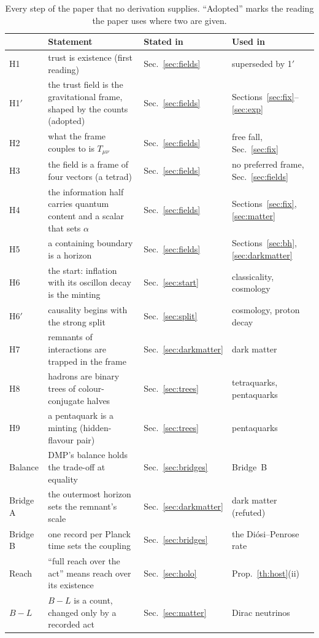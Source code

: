 \begin{table}[tb]\centering\small
\caption{Every step of the paper that no derivation supplies. ``Adopted'' marks the reading the paper uses where two are given.}
\label{tab:hyp}
\begin{tabularx}{\linewidth}{@{}lLlL@{}}
\toprule
& Statement & Stated in & Used in \\
\midrule
H1 & trust is existence (first reading) & Sec.~\ref{sec:fields} & superseded by 1$'$ \\
H1$'$ & the trust field is the gravitational frame, shaped by the counts (adopted) & Sec.~\ref{sec:fields} & Sections~\ref{sec:fix}--\ref{sec:exp} \\
H2 & what the frame couples to is $T_{\mu\nu}$ & Sec.~\ref{sec:fields} & free fall, Sec.~\ref{sec:fix} \\
H3 & the field is a frame of four vectors (a tetrad) & Sec.~\ref{sec:fields} & no preferred frame, Sec.~\ref{sec:fields} \\
H4 & the information half carries quantum content and a scalar that sets $\alpha$ & Sec.~\ref{sec:fields} & Sections~\ref{sec:fix}, \ref{sec:matter} \\
H5 & a containing boundary is a horizon & Sec.~\ref{sec:fields} & Sections~\ref{sec:bh}, \ref{sec:darkmatter} \\
H6 & the start: inflation with its oscillon decay is the minting & Sec.~\ref{sec:start} & classicality, cosmology \\
H6$'$ & causality begins with the strong split & Sec.~\ref{sec:split} & cosmology, proton decay \\
H7 & remnants of interactions are trapped in the frame & Sec.~\ref{sec:darkmatter} & dark matter \\
H8 & hadrons are binary trees of colour-conjugate halves & Sec.~\ref{sec:trees} & tetraquarks, pentaquarks \\
H9 & a pentaquark is a minting (hidden-flavour pair) & Sec.~\ref{sec:trees} & pentaquarks \\
Balance & DMP's balance holds the trade-off at equality & Sec.~\ref{sec:bridges} & Bridge~B \\
Bridge A & the outermost horizon sets the remnant's scale & Sec.~\ref{sec:darkmatter} & dark matter (refuted) \\
Bridge B & one record per Planck time sets the coupling & Sec.~\ref{sec:bridges} & the Di\'osi--Penrose rate \\
Reach & ``full reach over the act'' means reach over its existence & Sec.~\ref{sec:holo} & Prop.~\ref{th:host}(ii) \\
$B-L$ & $B-L$ is a count, changed only by a recorded act & Sec.~\ref{sec:matter} & Dirac neutrinos \\
\bottomrule
\end{tabularx}
\end{table}

